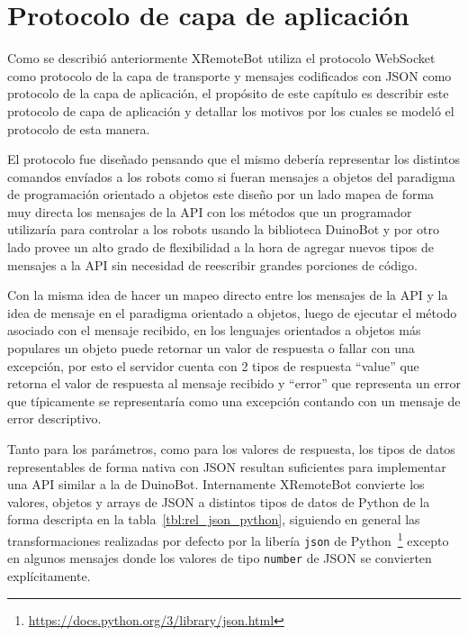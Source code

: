 \chapter{Protocolo de capa de aplicación}\label{ch3}

Como se describió anteriormente XRemoteBot utiliza el protocolo WebSocket como
protocolo de la capa de transporte y mensajes codificados con JSON como
protocolo de la capa de aplicación, el propósito de este capítulo es describir
este protocolo de capa de aplicación y detallar los motivos por los cuales
se modeló el protocolo de esta manera.


El protocolo fue diseñado pensando que el mismo debería representar los
distintos comandos envíados a los robots como si fueran mensajes a objetos
del paradigma de programación orientado a objetos
este diseño por un lado mapea de forma muy directa los mensajes de la API
con los métodos que un programador utilizaría para controlar a los robots
usando la biblioteca DuinoBot y por otro lado provee un alto grado de
flexibilidad a la hora de agregar nuevos tipos de mensajes a la API sin
necesidad de reescribir grandes porciones de código.

Con la misma idea de hacer un mapeo directo entre los mensajes de la API
y la idea de mensaje en el paradigma orientado a objetos, luego de ejecutar
el método asociado con el mensaje recibido, en los lenguajes orientados a
objetos más populares un objeto puede retornar un valor de respuesta o fallar
con una excepción, por esto el servidor cuenta con 2 tipos de respuesta
``value'' que retorna el valor de respuesta al mensaje recibido y
``error'' que representa un error que típicamente se representaría como
una excepción contando con un mensaje de error descriptivo.

Tanto para los parámetros, como para los valores de respuesta, los tipos
de datos representables de forma nativa con JSON resultan suficientes para
implementar una API similar a la de DuinoBot. Internamente XRemoteBot
convierte los valores, objetos y arrays de JSON a distintos tipos de
datos de Python de la forma descripta en la
tabla~\ref{tbl:rel_json_python}, siguiendo en general las transformaciones
realizadas por defecto por la libería \texttt{json} de
Python~\footnote{\url{https://docs.python.org/3/library/json.html}}
excepto en algunos mensajes donde los valores de
tipo \texttt{number} de JSON se convierten explícitamente.

